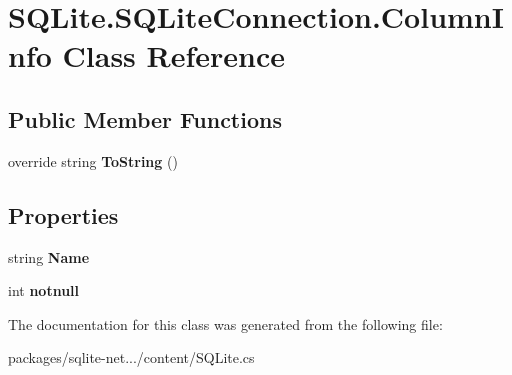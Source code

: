 \hypertarget{classSQLite_1_1SQLiteConnection_1_1ColumnInfo}{}\section{S\+Q\+Lite.\+S\+Q\+Lite\+Connection.\+Column\+Info Class Reference}
\label{classSQLite_1_1SQLiteConnection_1_1ColumnInfo}
\subsection*{Public Member Functions}
\begin{DoxyCompactItemize}
\item 
\hypertarget{classSQLite_1_1SQLiteConnection_1_1ColumnInfo_af1ba3d13d1ccc9d2389c086f4e64610c}{}override string {\bfseries To\+String} ()\label{classSQLite_1_1SQLiteConnection_1_1ColumnInfo_af1ba3d13d1ccc9d2389c086f4e64610c}

\end{DoxyCompactItemize}
\subsection*{Properties}
\begin{DoxyCompactItemize}
\item 
\hypertarget{classSQLite_1_1SQLiteConnection_1_1ColumnInfo_a6ff7d46bc88a8f3484f7b701732396fe}{}string {\bfseries Name}\label{classSQLite_1_1SQLiteConnection_1_1ColumnInfo_a6ff7d46bc88a8f3484f7b701732396fe}

\item 
\hypertarget{classSQLite_1_1SQLiteConnection_1_1ColumnInfo_a598f5773a3b0c9c66f2d9c46c6eb53cd}{}int {\bfseries notnull}\label{classSQLite_1_1SQLiteConnection_1_1ColumnInfo_a598f5773a3b0c9c66f2d9c46c6eb53cd}

\end{DoxyCompactItemize}


The documentation for this class was generated from the following file\+:\begin{DoxyCompactItemize}
\item 
packages/sqlite-\/net.../content/S\+Q\+Lite.\+cs\end{DoxyCompactItemize}
